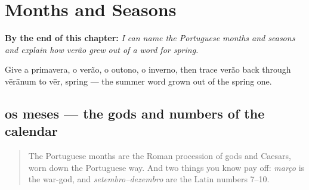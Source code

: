 
\chapter{Months and Seasons}
\label{ch:pt-months-and-seasons}

\begin{chapteropening}
\textbf{By the end of this chapter:} \emph{I can name the Portuguese months and seasons and explain how verão grew out of a word for spring.}

Give a primavera, o verão, o outono, o inverno, then trace verão back through vērānum to vēr, spring — the summer word grown out of the spring one.
\end{chapteropening}

\section[os meses]{os meses — the gods and numbers of the calendar}

\label{lesson:PT-C09-meses}



\begin{quote}
The Portuguese months are the Roman procession of gods and Caesars, worn down the Portuguese way. And two things you know pay off: \emph{março} is the war-god, and \emph{setembro–dezembro} are the Latin numbers 7–10.
\end{quote}

